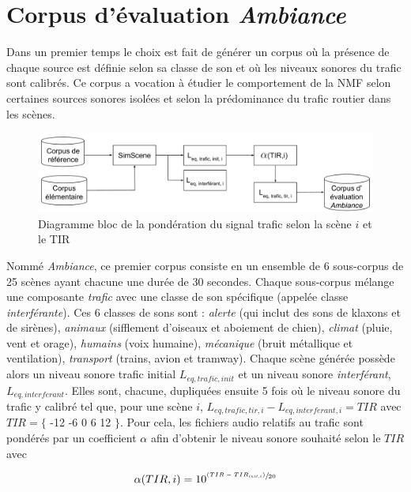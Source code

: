 \section{Corpus d'évaluation \textit{Ambiance}}
\label{part:corpus_ambiance}
Dans un premier temps le choix est fait de générer un corpus où la présence de chaque source est définie selon sa classe de son et où les niveaux sonores du trafic sont calibrés. Ce corpus a vocation à étudier le comportement de la NMF selon certaines sources sonores isolées et selon la prédominance du trafic routier dans les scènes.

\begin{figure}[ht]
\centering
\includegraphics[width=.9\linewidth]{./figures/autres/TIR_ambiance.pdf}
\caption{Diagramme bloc de la pondération du signal trafic selon la scène $i$ et le TIR}
\label{fig:bloc_diagram_tir}
\end{figure}


Nommé \textit{Ambiance}, ce premier corpus consiste en un ensemble de 6 sous-corpus de 25 scènes ayant chacune une durée de 30 secondes. Chaque sous-corpus mélange une composante \textit{trafic} avec une classe de son spécifique (appelée classe \textit{interférante}).
Ces 6 classes de sons sont : \textit{alerte} (qui inclut des sons de klaxons et de sirènes), \textit{animaux} (sifflement d'oiseaux et aboiement de chien), \textit{climat} (pluie, vent et orage), \textit{humains} (voix humaine), \textit{mécanique} (bruit métallique et ventilation), \textit{transport} (trains, avion et tramway).
Chaque scène générée possède alors un niveau sonore trafic initial $L_{eq,trafic,init}$ et un niveau sonore \textit{interférant}, $L_{eq,interferant}$. Elles sont, chacune, dupliquées ensuite 5 fois où le niveau sonore du trafic y calibré tel que, pour une scène $i$, $L_{eq,trafic, tir, i} - L_{eq,interferant, i} = TIR$ avec $TIR = \lbrace$ -12 -6 0 6 12 $\rbrace$. Pour cela, les fichiers audio relatifs au trafic sont pondérés par un coefficient $\alpha$ afin d'obtenir le niveau sonore souhaité selon le $TIR$ avec

\begin{equation}
\alpha(TIR,i) = 10^{\sfrac{(TIR-TIR_{init,i})}{20}}
\end{equation}

